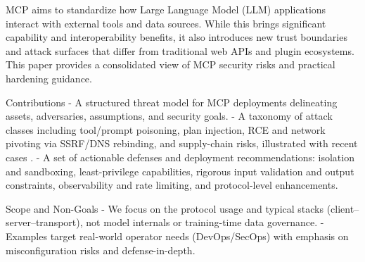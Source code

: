 MCP aims to standardize how Large Language Model (LLM) applications interact with external tools and data sources. While this brings significant capability and interoperability benefits, it also introduces new trust boundaries and attack surfaces that differ from traditional web APIs and plugin ecosystems. This paper provides a consolidated view of MCP security risks and practical hardening guidance.

Contributions
- A structured threat model for MCP deployments delineating assets, adversaries, assumptions, and security goals.
- A taxonomy of attack classes including tool/prompt poisoning, plan injection, RCE and network pivoting via SSRF/DNS rebinding, and supply-chain risks, illustrated with recent cases \cite{arXiv250323278,arXiv250907595,arXiv250812566,MDPIElectronics3267}.
- A set of actionable defenses and deployment recommendations: isolation and sandboxing, least-privilege capabilities, rigorous input validation and output constraints, observability and rate limiting, and protocol-level enhancements.

Scope and Non-Goals
- We focus on the protocol usage and typical stacks (client–server–transport), not model internals or training-time data governance.
- Examples target real-world operator needs (DevOps/SecOps) with emphasis on misconfiguration risks and defense-in-depth.

